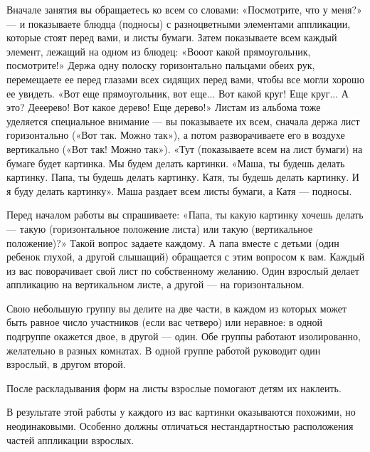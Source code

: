 \documentclass[a5paper]{book}
\begin{document}
Вначале занятия вы обращаетесь ко всем со словами: «Посмотрите, что у
меня?» --- и показываете блюдца (подносы) с разноцветными элементами
аппликации, которые стоят перед вами, и листы бумаги. Затем показываете
всем каждый элемент, лежащий на одном из блюдец: «Вооот какой
прямоугольник, посмотрите!» Держа одну полоску горизонтально пальцами
обеих рук, перемещаете ее перед глазами всех сидящих перед вами, чтобы
все могли хорошо ее увидеть. «Вот еще прямоугольник, вот еще... Вот
какой круг! Еще круг... А это? Дееерево! Вот какое дерево! Еще дерево!»
Листам из альбома тоже уделяется специальное внимание --- вы показываете
их всем, сначала держа лист горизонтально («Вот так. Можно так»), а
потом разворачиваете его в воздухе вертикально («Вот так! Можно так»).
«Тут (показываете всем на лист бумаги) на бумаге будет картинка. Мы
будем делать картинки. «Маша, ты будешь делать картинку. Папа, ты будешь
делать картинку. Катя, ты будешь делать картинку. И я буду делать
картинку». Маша раздает всем листы бумаги, а Катя --- подносы.

Перед началом работы вы спрашиваете: «Папа, ты какую картинку хочешь
делать --- такую (горизонтальное положение листа) или такую
(вертикальное положение)?» Такой вопрос задаете каждому. А папа вместе с
детьми (один ребенок глухой, а другой слышащий) обращается с этим
вопросом к вам. Каждый из вас поворачивает свой лист по собственному
желанию. Один взрослый делает аппликацию на вертикальном листе, а другой
--- на горизонтальном.

Свою небольшую группу вы делите на две части, в каждом из которых может
быть равное число участников (если вас четверо) или неравное: в одной
подгруппе окажется двое, в другой --- один. Обе группы работают
изолированно, желательно в разных комнатах. В одной группе работой
руководит один взрослый, в другом второй.

После раскладывания форм на листы взрослые помогают детям их наклеить.

В результате этой работы у каждого из вас картинки оказываются похожими,
но неодинаковыми. Особенно должны отличаться нестандартностью
расположения частей аппликации взрослых.
\end{document}
